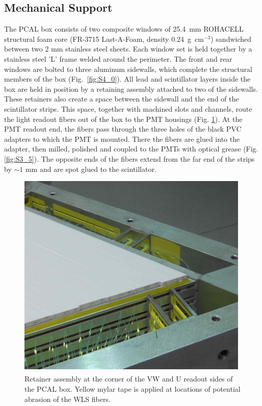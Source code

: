 \subsection{Mechanical Support}
The PCAL box consists of two composite windows of 25.4~mm ROHACELL structural foam core (FR-3715 Last-A-Foam, density 0.24~g~cm$^{-3}$) sandwiched between two 2 mm stainless steel sheets.  Each window set is held together by a stainless steel 'L' frame welded around the perimeter.  The front and rear windows are bolted to three aluminum sidewalls, which complete the structural members of the box (Fig.~\ref{fig:S4_0}).  All lead and scintillator layers inside the box are held in position by a retaining assembly attached to two of the sidewalls.  These retainers also create a space between the sidewall and the end of the scintillator strips.  This space, together with machined slots and channels, route the light readout fibers out of the box to the PMT housings (Fig. \ref{fig:S3_6}).  At the PMT readout end, the fibers pass through the three holes of the black PVC adapters to which the PMT is mounted.  There the fibers are glued into the adapter, then milled, polished and coupled to the PMTs with optical grease (Fig. \ref{fig:S3_5}). The opposite ends of the fibers extend from the far end of the strips by $\sim 1$ mm and are spot glued to the scintillator.  

\begin{figure}[hbt]
\centering
\includegraphics[width=0.95\columnwidth,keepaspectratio]{img/S3_6.png}
\caption[PCAL UVW Layers]{Retainer assembly at the corner of the VW and U readout sides of the PCAL box. Yellow mylar tape is applied at locations of potential abrasion of the WLS fibers.}
\label{fig:S3_6}
\end{figure}

